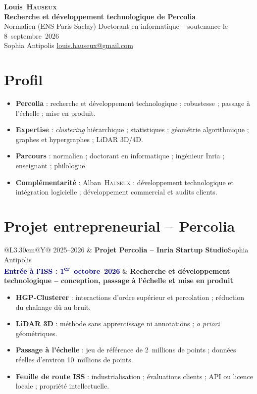 \documentclass[10pt,a4paper]{article}
\makeatletter
\newcommand{\ensparissaclay}{ENS Paris-Saclay}
\newcommand{\cventry}[5]{%
  \begin{tabularx}{\textwidth}{@{}L{3.30cm}@{\hspace{0.22cm}}Y@{}}
    \textcolor{softgray}{#1} & \textbf{#3}\hfill\textcolor{softgray}{#4}\\[-0.10ex]
    \small\textcolor{darkblue}{\textbf{#2}} & \textbf{#5}
  \end{tabularx}\vspace{-0.22em}
}
\makeatother
\begin{document}
\pagestyle{empty}
\frenchspacing
\RaggedRight
{}

\begin{center}
  {\LARGE\bfseries Louis~\textsc{Hauseux}}\\[0.20em]
  {\large\bfseries\color{darkblue}Recherche et développement technologique de Percolia}\\[0.10em]
  {\normalsize Normalien (\ensparissaclay) \textbullet{} Doctorant en informatique -- soutenance le 8~septembre~2026}\\[0.28em]
  Sophia Antipolis
  \enspace\textcolor{midblue}{\textbullet}\enspace
  \href{mailto:louis.hauseux@gmail.com}{louis.hauseux@gmail.com}
\end{center}
\vspace{-0.48em}

\section*{Profil}
\begin{itemize}[leftmargin=1.25em]
  \item \textbf{Percolia} : recherche et développement technologique ; robustesse ;
  passage à l'échelle ; mise en produit.
  \item \textbf{Expertise} : \emph{clustering} hiérarchique ; statistiques ; géométrie
  algorithmique ; graphes et hypergraphes ; LiDAR 3D/4D.
  \item \textbf{Parcours} : normalien ; doctorant en informatique ; ingénieur Inria ;
  enseignant ; philologue.
  \item \textbf{Complémentarité} : Alban~\textsc{Hauseux} : développement technologique et
  intégration logicielle ; développement commercial et audits clients.
\end{itemize}

\section*{Projet entrepreneurial -- Percolia}
\cventry{2025--2026}{Entrée à l'ISS : 1\textsuperscript{er}~octobre~2026}{Projet Percolia -- Inria Startup Studio}{Sophia Antipolis}{Recherche et développement technologique -- conception, passage à l'échelle et mise en produit}
\begin{itemize}
  \item \textbf{HGP-Clusterer} : interactions d'ordre supérieur et percolation ; réduction du
  chaînage dû au bruit.
  \item \textbf{LiDAR 3D} : méthode sans apprentissage ni annotations ; \emph{a priori}
  géométriques.
  \item \textbf{Passage à l'échelle} : jeu de référence de 2~millions de points ; données réelles
  d'environ 10~millions de points.
  \item \textbf{Feuille de route ISS} : industrialisation ; évaluations clients ; API ou
  licence locale ; propriété intellectuelle.
\end{itemize}
\end{document}
